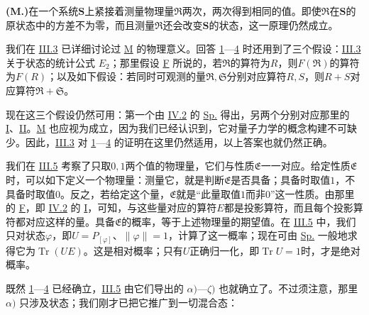 \documentclass[fontsize=13pt,twoside,openany,headings=normal,parskip=false,bookmarkpackage=false,DIV=calc]{scrbook}
\begin{document}
\noindent{}\textbf{(M.)}\label{post:IV.3.M}在一个系统$\boldsymbol{S}$上紧接着测量物理量$\mathfrak R$两次，两次得到相同的值。即使$\mathfrak R$在$\boldsymbol{S}$的原状态中的方差不为零，而且测量$\mathfrak R$还会改变$\boldsymbol{S}$的状态，这一原理仍然成立。

我们在 \hyperref[sec:III.3]{III.3} 已详细讨论过 \hyperref[post:IV.3.M]{M} 的物理意义。回答 \hyperref[criterion:IV.3.1]{1}—\hyperref[criterion:IV.3.4]{4} 时还用到了三个假设：\hyperref[sec:III.3]{III.3} 关于状态的统计公式 \hyperref[post:III.1.E2]{$E_2$}；那里假设 \hyperref[post:III.1.F]{F} 所说的，若$\mathfrak R$的算符为$R$，则$F(\mathfrak R)$的算符为$F(R)$；以及如下假设：若同时可观测的量$\mathfrak R,\allowbreak \mathfrak S$分别对应算符$R,\allowbreak S$，则$R+S$对应算符$\mathfrak R+\mathfrak S$。

现在这三个假设仍然可用：第一个由 \hyperref[sec:IV.2]{IV.2} 的 \hyperref[eq:IV.2.Sp]{Sp.} 得出，另两个分别对应那里的 \hyperref[cond:IV.2.I]{I}、\hyperref[cond:IV.2.II]{II}。\hyperref[post:IV.3.M]{M} 也应视为成立，因为我们已经认识到，它对量子力学的概念构建不可缺少。因此，\hyperref[sec:III.3]{III.3} 对 \hyperref[criterion:IV.3.1]{1}—\hyperref[criterion:IV.3.4]{4} 的证明在这里仍然适用，以上答案也就仍然正确。

我们在 \hyperref[sec:III.5]{III.5} 考察了只取$0,\allowbreak 1$两个值的物理量，它们与性质$\mathfrak E$一一对应。给定性质$\mathfrak E$时，可以如下定义一个物理量：测量它，就是判断$\mathfrak E$\hypertarget{origpage-178}{}\label{origpage-178}是否具备；具备时取值$1$，不具备时取值$0$。反之，若给定这个量，$\mathfrak E$就是“此量取值$1$而非$0$”这一性质。由那里的 \hyperref[post:III.5.F]{F}，即 \hyperref[sec:IV.2]{IV.2} 的 \hyperref[cond:IV.2.I]{I}，可知，与这些量对应的算符$E$都是投影算符，而且每个投影算符都对应这样的量。具备$\mathfrak E$的概率，等于上述物理量的期望值。在 \hyperref[sec:III.5]{III.5} 中，我们只对状态$\varphi$，即$U=P_{[\varphi]}$、$\|\varphi\|=1$，计算了这一概率；现在可由 \hyperref[eq:IV.2.Sp]{Sp.} 一般地求得它为$\operatorname{Tr}(UE)$。这是相对概率；只有$U$正确归一化，即$\operatorname{Tr}U=1$时，才是绝对概率。

既然 \hyperref[criterion:IV.3.1]{1}—\hyperref[criterion:IV.3.4]{4} 已经确立，\hyperref[sec:III.5]{III.5} 由它们导出的 \hyperref[post:III.5.alpha]{$\alpha)$}—\hyperref[post:III.5.zeta]{$\zeta)$} 也就确立了。不过须注意，那里 \hyperref[post:III.5.alpha]{$\alpha)$} 只涉及状态；我们刚才已把它推广到一切混合态：
\end{document}
